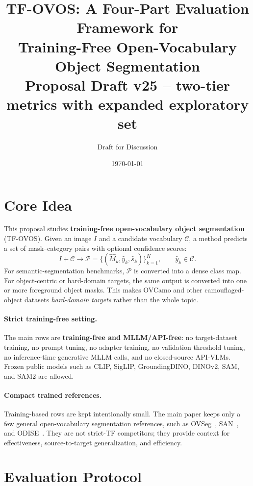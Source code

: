 \documentclass[11pt,a4paper]{article}
\title{\textbf{TF-OVOS}: A Four-Part Evaluation Framework for \\
       Training-Free Open-Vocabulary Object Segmentation \\
       \vspace{0.3em}
       \large{Proposal Draft v25 -- two-tier metrics with expanded exploratory set}}
\author{Draft for Discussion}
\date{\today}
\begin{document}
\maketitle

\section{Core Idea}

This proposal studies \textbf{training-free open-vocabulary object segmentation} (TF-OVOS). Given an image $I$ and a candidate vocabulary $\mathcal{C}$, a method predicts a set of mask--category pairs with optional confidence scores:
\begin{equation}
I+\mathcal{C}\rightarrow \mathcal{P}=\{(\hat{M}_k,\hat{y}_k,\hat{s}_k)\}_{k=1}^{K}, \qquad \hat{y}_k\in\mathcal{C}.
\end{equation}
For semantic-segmentation benchmarks, $\mathcal{P}$ is converted into a dense class map. For object-centric or hard-domain targets, the same output is converted into one or more foreground object masks. This makes OVCamo and other camouflaged-object datasets \emph{hard-domain targets} rather than the whole topic.

\paragraph{Strict training-free setting.}
The main rows are \textbf{training-free and MLLM/API-free}: no target-dataset training, no prompt tuning, no adapter training, no validation threshold tuning, no inference-time generative MLLM calls, and no closed-source API-VLMs. Frozen public models such as CLIP, SigLIP, GroundingDINO, DINOv2, SAM, and SAM2 are allowed.

\paragraph{Compact trained references.}
Training-based rows are kept intentionally small. The main paper keeps only a few general open-vocabulary segmentation references, such as OVSeg~\cite{ovseg2023}, SAN~\cite{san2023}, and ODISE~\cite{odise2023}. They are not strict-TF competitors; they provide context for effectiveness, source-to-target generalization, and efficiency.


\section{Evaluation Protocol}
\end{document}
